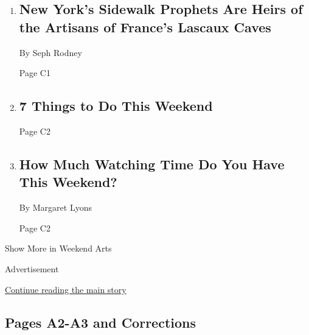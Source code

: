\begin{enumerate}
\def\labelenumi{\arabic{enumi}.}
\item
  \href{/2020/08/06/arts/design/street-art-nyc-george-floyd.html}{}

  \hypertarget{new-yorks-sidewalk-prophets-are-heirs-of-the-artisans-of-frances-lascaux-caves-1}{%
  \subsection{New York's Sidewalk Prophets Are Heirs of the Artisans of
  France's Lascaux
  Caves}\label{new-yorks-sidewalk-prophets-are-heirs-of-the-artisans-of-frances-lascaux-caves-1}}

  By Seph Rodney

  Page C1
\item
  \href{/2020/08/06/arts/things-to-do-weekend-coronavirus.html}{}

  \hypertarget{7-things-to-do-this-weekend}{%
  \subsection{7 Things to Do This
  Weekend}\label{7-things-to-do-this-weekend}}

  Page C2
\item
  \href{/2020/08/06/arts/television/hitmen-peacock-howard-ashman-disney.html}{}

  \hypertarget{how-much-watching-time-do-you-have-this-weekend}{%
  \subsection{How Much Watching Time Do You Have This
  Weekend?}\label{how-much-watching-time-do-you-have-this-weekend}}

  By Margaret Lyons

  Page C2
\end{enumerate}

Show More in Weekend Arts

Advertisement

\protect\hyperlink{after-mid5}{Continue reading the main story}

\hypertarget{pages-a2-a3-and-corrections}{%
\subsection{Pages A2-A3 and
Corrections}\label{pages-a2-a3-and-corrections}}

